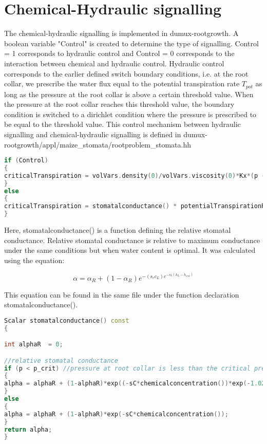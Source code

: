 \chapter*{Chemical-Hydraulic signalling}

The chemical-hydraulic signalling is implemented in dumux-rootgrowth. A boolean variable "Control" is created to determine the type of signalling. Control = 1 corresponds to hydraulic control and Control = 0 corresponds to the interaction between chemical and hydraulic control. Hydraulic control corresponds to the earlier defined switch boundary conditions, i.e. at the root collar, we prescribe the water flux equal to the potential transpiration rate
$T_{pot}$ as long as the pressure at the root collar is above a certain threshold value. When
the pressure at the root collar reaches this threshold value, the boundary condition is
switched to a dirichlet condition where the pressure is prescribed to be equal to the threshold value. 
This control mechanism between hydraulic signalling and chemical-hydraulic signalling is defined in dumux-rootgrowth/appl/maize\_stomata/rootproblem\_stomata.hh


\begin{lstlisting}[language=C++, caption={control mechanism between hydraulic and chemical-hydraulic signalling}]
if (Control)
{
criticalTranspiration = volVars.density(0)/volVars.viscosity(0)*Kx*(p - criticalCollarPressure_)/dist;
}
else
{
criticalTranspiration = stomatalconductance() * potentialTranspirationRate();    
}
\end{lstlisting}

Here, stomatalconductance() is a function defining the relative stomatal conductance. Relative stomatal conductance is relative to maximum conductance under the same conditions but when water content is optimal. It was calculated using the equation:

\begin{equation}
\alpha = \alpha_R + (1-\alpha_R)e^{-(s_cc_L)e^{-s_h(h_L-h_{crit})}}
\label{stomatalconductance}
\end{equation}

This equation can be found in the same file under the function declaration stomatalconductance().

\begin{lstlisting}[language=C++, caption={Function definition of relative stomatal conductance}]
Scalar stomatalconductance() const
{

int alphaR  = 0;

//relative stomatal conductance
if (p < p_crit) //pressure at root collar is less than the critical pressure
{   
alpha = alphaR + (1-alphaR)*exp((-sC*chemicalconcentration())*exp(-1.02e-6*(p-p_crit)));
}
else
{
alpha = alphaR + (1-alphaR)*exp(-sC*chemicalconcentration());  
}
return alpha;  
}
\end{lstlisting}

